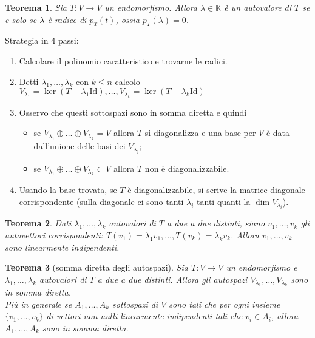 \documentclass[9pt, a4paper]{article}
\newcommand{\K}{\mathbb{K}}
\newcommand{\Id}{\mathrm{Id}}
\theoremstyle{mythm}
\newtheorem{thm}{Teorema}[section]
\begin{document}
\begin{thm}
	Sia $ T \colon V \to V $ un endomorfismo. Allora $ \lambda \in \K $ è un autovalore di $ T $ se e solo se $ \lambda $ è radice di $ p_T(t) $, ossia $ p_T(\lambda) = 0 $. 
\end{thm}

Strategia in 4 passi:
\begin{enumerate}
	\item Calcolare il polinomio caratteristico e trovarne le radici.
	\item Detti $ \lambda_1, \ldots, \lambda_k $ con $ k \leq n $ calcolo $ V_{\lambda_1} = \ker(T - \lambda_1 \Id), \ldots, V_{\lambda_k} = \ker(T - \lambda_k \Id) $
	\item Osservo che questi sottospazi sono in somma diretta e quindi 
	\begin{itemize}
		\item se $ V_{\lambda_1} \oplus \ldots \oplus V_{\lambda_k} = V $ allora $ T $ si diagonalizza e una base per $ V $ è data dall'unione delle basi dei $ V_{\lambda_j} $;
		\item se $ V_{\lambda_1} \oplus \ldots \oplus V_{\lambda_k} \subset V $ allora $ T $ non è diagonalizzabile.
	\end{itemize}
	\item Usando la base trovata, se $ T $ è diagonalizzabile, si scrive la matrice diagonale corrispondente (sulla diagonale ci sono tanti $ \lambda_i $ tanti quanti la $ \dim V_{\lambda_i} $). 
\end{enumerate}

\begin{thm}
	Dati $ \lambda_1, \ldots, \lambda_k $ autovalori di $ T $ a due a due distinti, siano $ v_1, \ldots, v_k $ gli autovettori corrispondenti: $ T(v_1) = \lambda_1 v_1, \ldots, T(v_k) = \lambda_k v_k $. Allora $ v_1, \ldots, v_k $ sono linearmente indipendenti. 
\end{thm}

\begin{thm}[somma diretta degli autospazi]
	Sia $ T \colon V \to V $ un endomorfismo e $ \lambda_1, \ldots, \lambda_k $ autovalori di $ T $ a due a due distinti. Allora gli autospazi $ V_{\lambda_1}, \ldots, V_{\lambda_k} $ sono in somma diretta. \\
	Più in generale se $ A_1, \ldots, A_k $ sottospazi di $ V $ sono tali che per ogni insieme $ \{v_1, \ldots, v_k\} $ di vettori non nulli linearmente indipendenti tali che $ v_i \in A_i $, allora $ A_1, \ldots, A_k $ sono in somma diretta. 
\end{thm}
\end{document}
